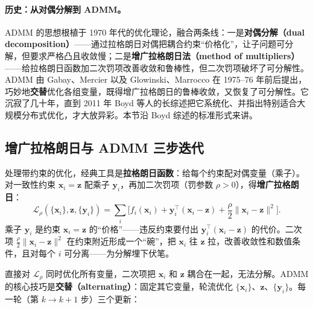 \paragraph{历史：从对偶分解到 ADMM。}
ADMM 的思想根植于 1970 年代的优化理论，融合两条线：一是\textbf{对偶分解（dual decomposition）}——通过拉格朗日对偶把耦合约束“价格化”，让子问题可分解，但要求严格凸且收敛慢；二是\textbf{增广拉格朗日法（method of multipliers）}——给拉格朗日函数加二次罚项改善收敛和鲁棒性，但二次罚项破坏了可分解性。ADMM 由 Gabay、Mercier 以及 Glowinski、Marrocco 在 1975--76 年前后提出，巧妙地\textbf{交替}优化各组变量，既得增广拉格朗日的鲁棒收敛，又恢复了可分解性。它沉寂了几十年，直到 2011 年 Boyd 等人的长综述把它系统化、并指出特别适合大规模分布式优化，才大放异彩\cite{boyd2011admm}。本节沿 Boyd 综述的标准形式来讲。

\subsection{增广拉格朗日与 ADMM 三步迭代}
\label{sec:cs-admm-derive}

处理带约束的优化，经典工具是\textbf{拉格朗日函数}：给每个约束配对偶变量（乘子）。对一致性约束 $\mathbf{x}_i=\mathbf{z}$ 配乘子 $\mathbf{y}_i$，再加二次罚项（罚参数 $\rho>0$），得\textbf{增广拉格朗日}：
\begin{equation}
  \mathcal{L}_\rho(\{\mathbf{x}_i\},\mathbf{z},\{\mathbf{y}_i\})=\sum_i\Big[f_i(\mathbf{x}_i)+\mathbf{y}_i^\top(\mathbf{x}_i-\mathbf{z})+\frac{\rho}{2}\|\mathbf{x}_i-\mathbf{z}\|^2\Big].
  \label{eq:cs-aug-lag}
\end{equation}
乘子 $\mathbf{y}_i$ 是约束 $\mathbf{x}_i=\mathbf{z}$ 的“价格”——违反约束要付出 $\mathbf{y}_i^\top(\mathbf{x}_i-\mathbf{z})$ 的代价。二次项 $\tfrac\rho2\|\mathbf{x}_i-\mathbf{z}\|^2$ 在约束附近形成一个“碗”，把 $\mathbf{x}_i$ 往 $\mathbf{z}$ 拉，改善收敛性和数值条件，且对每个 $i$ 可分离——为分解埋下伏笔。

直接对 $\mathcal{L}_\rho$ 同时优化所有变量，二次项把 $\mathbf{x}_i$ 和 $\mathbf{z}$ 耦合在一起，无法分解。ADMM 的核心技巧是\textbf{交替（alternating）}：固定其它变量，轮流优化 $\{\mathbf{x}_i\}$、$\mathbf{z}$、$\{\mathbf{y}_i\}$。每一轮（第 $k\to k{+}1$ 步）三个更新：

